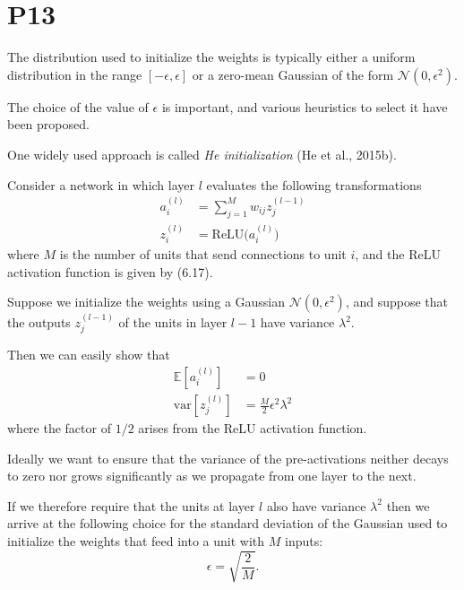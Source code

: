 \documentclass{article}
\begin{document}
\section{P13}

The distribution used to initialize the weights is typically either a uniform distribution in the range $[-\epsilon,\epsilon]$ or a zero-mean Gaussian of the form $\mathcal{N}(0,\epsilon^2)$. 

The choice of the value of $\epsilon$ is important, and various heuristics to select it have been proposed. 

One widely used approach is called \emph{He initialization} (He et al., 2015b). 

Consider a network in which layer $l$ evaluates the following transformations
\begin{align}
a_i^{(l)} &= \sum_{j=1}^{M} w_{ij} z_j^{(l-1)} \tag{7.19} \\
z_i^{(l)} &= \mathrm{ReLU}\bigl(a_i^{(l)}\bigr) \tag{7.20}
\end{align}
where $M$ is the number of units that send connections to unit $i$, and the ReLU activation function is given by (6.17). 

Suppose we initialize the weights using a Gaussian $\mathcal{N}(0,\epsilon^2)$, and suppose that the outputs $z_j^{(l-1)}$ of the units in layer $l-1$ have variance $\lambda^2$. 

Then we can easily show that
\begin{align}
\mathbb{E}[a_i^{(l)}] &= 0 \tag{7.21} \\
\mathrm{var}[z_j^{(l)}] &= \frac{M}{2} \epsilon^2 \lambda^2 \tag{7.22}
\end{align}
where the factor of $1/2$ arises from the ReLU activation function. 

Ideally we want to ensure that the variance of the pre-activations neither decays to zero nor grows significantly as we propagate from one layer to the next. 

If we therefore require that the units at layer $l$ also have variance $\lambda^2$ then we arrive at the following choice for the standard deviation of the Gaussian used to initialize the weights that feed into a unit with $M$ inputs:
\begin{equation}
\epsilon = \sqrt{\frac{2}{M}}.
\tag{7.23}
\end{equation}
\end{document}
